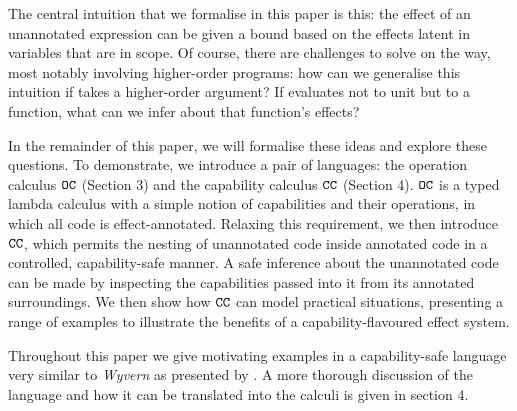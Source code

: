 The central intuition that we formalise in this paper is this: the effect of an unannotated expression can be given a bound based on the effects latent in variables that are in scope.
Of course, there are challenges to solve on the way, most notably involving higher-order programs: how can we generalise this intuition if  takes a higher-order argument?
If  evaluates not to unit but to a function, what can we infer about that function's effects?

In the remainder of this paper, we will formalise these ideas and explore these questions.
To demonstrate, we introduce a pair of languages: the operation calculus $\mathtt{OC}$ (Section 3) and the capability calculus $\mathtt{CC}$ (Section 4).
$\mathtt{OC}$ is a typed lambda calculus with a simple notion of capabilities and their operations, in which all code is effect-annotated.
Relaxing this requirement, we then introduce $\mathtt{CC}$, which permits the nesting of unannotated code inside annotated code in a controlled, capability-safe manner.
A safe inference about the unannotated code can be made by inspecting the capabilities passed into it from its annotated surroundings.
We then show how $\mathtt{CC}$ can model practical situations, presenting a range of examples to illustrate the benefits of a capability-flavoured effect system.

Throughout this paper we give motivating examples in a capability-safe language very similar to \textit{Wyvern} as presented by \citet{nistor13}.
A more thorough discussion of the language and how it can be translated into the calculi is given in section 4.
